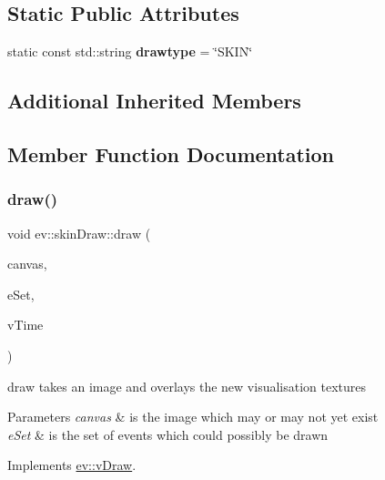 \subsection*{Static Public Attributes}
\begin{DoxyCompactItemize}
\item 
\mbox{\label{classev_1_1skinDraw_a95970aec26d3174050d36bb4f15d5413}} 
static const std\+::string {\bfseries drawtype} = \char`\"{}S\+K\+IN\char`\"{}
\end{DoxyCompactItemize}
\subsection*{Additional Inherited Members}


\subsection{Member Function Documentation}
\mbox{\label{classev_1_1skinDraw_a4cbf578dd04c6a634c8959fea7295060}} 
\subsubsection{\texorpdfstring{draw()}{draw()}}
{\footnotesize\ttfamily void ev\+::skin\+Draw\+::draw (\begin{DoxyParamCaption}\item[{cv\+::\+Mat \&}]{canvas,  }\item[{const ev\+::v\+Queue \&}]{e\+Set,  }\item[{int}]{v\+Time }\end{DoxyParamCaption})\hspace{0.3cm}{\ttfamily [virtual]}}



draw takes an image and overlays the new visualisation textures 


\begin{DoxyParams}{Parameters}
{\em canvas} & is the image which may or may not yet exist \\
\hline
{\em e\+Set} & is the set of events which could possibly be drawn \\
\hline
\end{DoxyParams}


Implements \hyperlink{classev_1_1vDraw_af1eee5dcdf3b4cfee6a3024e5cd706f8}{ev\+::v\+Draw}.

